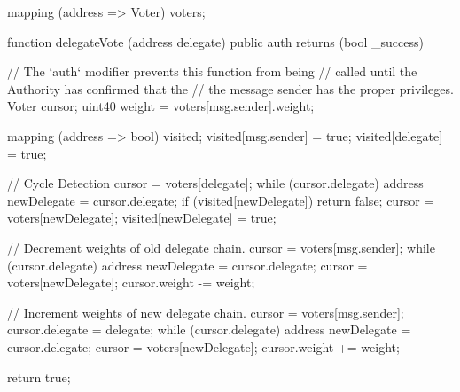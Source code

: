 \begin{solidity}
mapping (address => Voter) voters;

function delegateVote (address delegate) public auth returns (bool _success) {
  // The `auth` modifier prevents this function from being
  // called until the Authority has confirmed that the
  // the message sender has the proper privileges.
  Voter cursor;
  uint40 weight = voters[msg.sender].weight;

  mapping (address => bool) visited;
  visited[msg.sender] = true;
  visited[delegate] = true;

  // Cycle Detection
  cursor = voters[delegate];
  while (cursor.delegate) {
    address newDelegate = cursor.delegate;
    if (visited[newDelegate]) return false;
    cursor = voters[newDelegate];
    visited[newDelegate] = true;
  }

  // Decrement weights of old delegate chain.
  cursor = voters[msg.sender];
  while (cursor.delegate) {
    address newDelegate = cursor.delegate;
    cursor = voters[newDelegate];
    cursor.weight -= weight;
  }

  // Increment weights of new delegate chain.
  cursor = voters[msg.sender];
  cursor.delegate = delegate;
  while (cursor.delegate) {
    address newDelegate = cursor.delegate;
    cursor = voters[newDelegate];
    cursor.weight += weight;
  }

  return true;
}
\end{solidity}
